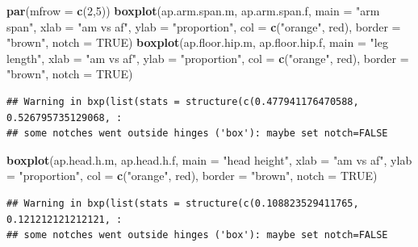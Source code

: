\documentclass[]{article}
\newenvironment{Shaded}{\begin{snugshade}}{\end{snugshade}}
\newcommand{\DataTypeTok}[1]{\textcolor[rgb]{0.13,0.29,0.53}{#1}}
\newcommand{\DecValTok}[1]{\textcolor[rgb]{0.00,0.00,0.81}{#1}}
\newcommand{\KeywordTok}[1]{\textcolor[rgb]{0.13,0.29,0.53}{\textbf{#1}}}
\newcommand{\NormalTok}[1]{#1}
\newcommand{\OtherTok}[1]{\textcolor[rgb]{0.56,0.35,0.01}{#1}}
\newcommand{\StringTok}[1]{\textcolor[rgb]{0.31,0.60,0.02}{#1}}
\begin{document}
\begin{Shaded}
\begin{Highlighting}[]
\KeywordTok{par}\NormalTok{(}\DataTypeTok{mfrow =} \KeywordTok{c}\NormalTok{(}\DecValTok{2}\NormalTok{,}\DecValTok{5}\NormalTok{))}
\KeywordTok{boxplot}\NormalTok{(ap.arm.span.m, ap.arm.span.f,}
        \DataTypeTok{main =} \StringTok{"arm span"}\NormalTok{,}
        \DataTypeTok{xlab =} \StringTok{"am vs af"}\NormalTok{,}
        \DataTypeTok{ylab =} \StringTok{"proportion"}\NormalTok{,}
        \DataTypeTok{col =} \KeywordTok{c}\NormalTok{(}\StringTok{"orange"}\NormalTok{, }\StringTok{\textquotesingle{}red\textquotesingle{}}\NormalTok{),}
        \DataTypeTok{border =} \StringTok{"brown"}\NormalTok{,}
        \DataTypeTok{notch =} \OtherTok{TRUE}\NormalTok{)}
\KeywordTok{boxplot}\NormalTok{(ap.floor.hip.m, ap.floor.hip.f,}
        \DataTypeTok{main =} \StringTok{"leg length"}\NormalTok{,}
        \DataTypeTok{xlab =} \StringTok{"am vs af"}\NormalTok{,}
        \DataTypeTok{ylab =} \StringTok{"proportion"}\NormalTok{,}
        \DataTypeTok{col =} \KeywordTok{c}\NormalTok{(}\StringTok{"orange"}\NormalTok{, }\StringTok{\textquotesingle{}red\textquotesingle{}}\NormalTok{),}
        \DataTypeTok{border =} \StringTok{"brown"}\NormalTok{,}
        \DataTypeTok{notch =} \OtherTok{TRUE}\NormalTok{)}
\end{Highlighting}
\end{Shaded}

\begin{verbatim}
## Warning in bxp(list(stats = structure(c(0.477941176470588, 0.526795735129068, :
## some notches went outside hinges ('box'): maybe set notch=FALSE
\end{verbatim}

\begin{Shaded}
\begin{Highlighting}[]
\KeywordTok{boxplot}\NormalTok{(ap.head.h.m, ap.head.h.f,}
        \DataTypeTok{main =} \StringTok{"head height"}\NormalTok{,}
        \DataTypeTok{xlab =} \StringTok{"am vs af"}\NormalTok{,}
        \DataTypeTok{ylab =} \StringTok{"proportion"}\NormalTok{,}
        \DataTypeTok{col =} \KeywordTok{c}\NormalTok{(}\StringTok{"orange"}\NormalTok{, }\StringTok{\textquotesingle{}red\textquotesingle{}}\NormalTok{),}
        \DataTypeTok{border =} \StringTok{"brown"}\NormalTok{,}
        \DataTypeTok{notch =} \OtherTok{TRUE}\NormalTok{)}
\end{Highlighting}
\end{Shaded}

\begin{verbatim}
## Warning in bxp(list(stats = structure(c(0.108823529411765, 0.121212121212121, :
## some notches went outside hinges ('box'): maybe set notch=FALSE
\end{verbatim}
\end{document}
